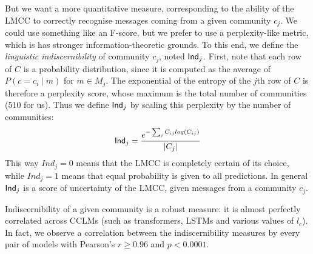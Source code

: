 \documentclass[11pt]{article}
\begin{document}
But we want a more quantitative measure, corresponding to the ability of the LMCC to correctly
recognise messages coming from a given community $c_j$. We could use
something like an F-score, but we prefer to use a perplexity-like metric,
which is has stronger information-theoretic grounds.
To this end, we define the \emph{linguistic indiscernibility} of community $c_j$, 
noted $\mathsf{Ind}_j$. 
First, note that each row of $C$ is a probability distribution,
since it is computed as the average of $P(c=c_i \mid m)$ for $m\in M_j$.
The exponential of the entropy of the $j$th row of \(C\) is therefore a perplexity score,
whose maximum is the total number of communities (510 for us).
Thus we define $\mathsf{Ind}_j$ by scaling this perplexity by the number of communities:
\[\mathsf{Ind}_j = \frac{e^{-\sum_i C_{ij} log(C_{ij})}}{|C_j|}\]
This way $Ind_j=0$ means that the LMCC is completely certain of its
choice, while $Ind_j=1$ means that equal probability is given to all
predictions.  In general $\mathsf{Ind}_j$ is a score of uncertainty of the
LMCC, given messages from a community $c_j$.

Indiscernibility of a given community is a robust measure: it is
almost perfectly correlated across CCLMs (such as transformers, LSTMs
and various values of $l_c$).  In fact, we observe a correlation
between the indiscernibility measures by every pair of models with
Pearson's $r \geq 0.96$ and $p < 0.0001$. 
\end{document}
